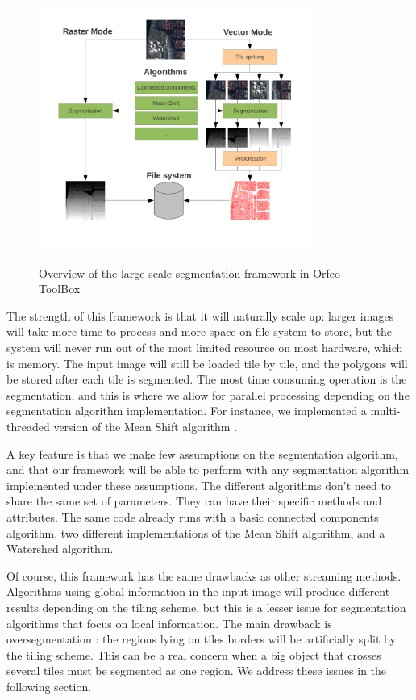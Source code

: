 \documentclass{josis}
\begin{document}
\begin{figure}[!htb]
\centering
\includegraphics[width=0.8\textwidth]{Pictures/schema_ogrs}\label{fig:overview}
\caption{Overview of the large scale segmentation framework in Orfeo-ToolBox}
\end{figure}

The strength of this framework is that it will naturally scale up:
larger images will take more time to process and more space on file
system to store, but the system will never run out of the most limited
resource on most hardware, which is memory. The input image will still be 
loaded tile by tile, and the polygons will be stored after each tile is 
segmented. The most time consuming
operation is the segmentation, and this is where we allow for parallel
processing depending on the segmentation algorithm implementation. For
instance, we implemented a multi-threaded version of the Mean Shift
algorithm \cite{Comaniciu2002mean}.
 
A key feature is that we make few assumptions on the segmentation
algorithm, and that our framework will be able to perform with any
segmentation algorithm implemented under these assumptions. The 
different algorithms don't need to share the same set of parameters. They 
can have their specific methods and attributes. The same
code already runs with a basic connected components algorithm, two
different implementations of the Mean Shift algorithm, and a Watershed algorithm.

Of course, this framework has the same drawbacks as other streaming
methods. Algorithms using global information in the input image will 
produce different results depending on the tiling scheme, but this is
a lesser issue for segmentation algorithms that focus on local information. 
The main drawback is oversegmentation : the regions lying on tiles borders 
will be artificially split by the tiling scheme. This can be a real concern 
when a big object that crosses several tiles must be segmented as one region.  
We address these issues in the following section.
\end{document}
